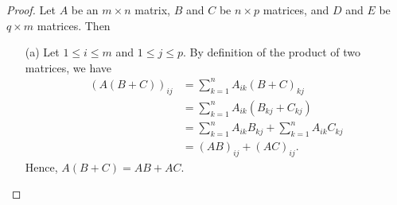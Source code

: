 \begin{proof}
    Let \( A  \) be an \( m \times n  \) matrix, \( B  \) and \(  C  \) be \( n \times p  \) matrices, and \( D  \) and \( E  \) be \( q \times  m  \) matrices. Then
\begin{enumerate}
    \item[(a)] Let \( 1 \leq i \leq m  \) and \( 1 \leq j \leq p  \). By definition of the product of two matrices, we have 
        \begin{align*}
            (A(B+C))_{ij} &= \sum_{ k=1 }^{ n } {A}_{ik } {(B+C)}_{kj} \\ 
               &= \sum_{ k=1 }^{ n } {A}_{ik } ({B}_{kj} + {C}_{kj} ) \\
               &= \sum_{ k=1 }^{ n } {A}_{ik } {B}_{kj} + \sum_{ k=1 }^{ n } {A}_{ik} {C}_{kj} \\ 
               &= (AB)_{ij} + (AC)_{ij}.    
        \end{align*}
        Hence, \( A(B+C) = AB + AC  \).
        

\end{enumerate}
\end{proof}
